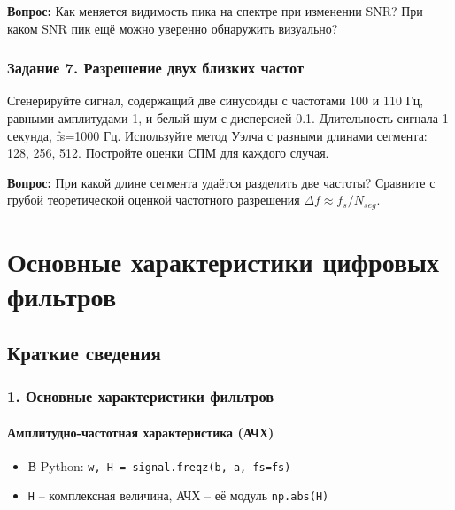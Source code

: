 \documentclass[12pt,a4paper,openany]{book}
\providecommand{\tightlist}{\setlength{\itemsep}{0pt}\setlength{\parskip}{0pt}}
\begin{document}
\textbf{Вопрос:} Как меняется видимость пика на спектре при изменении SNR? При каком SNR пик ещё можно уверенно обнаружить визуально?

\subsection*{Задание 7. Разрешение двух близких частот}

Сгенерируйте сигнал, содержащий две синусоиды с частотами 100 и 110 Гц, равными амплитудами 1, и белый шум с дисперсией 0.1. Длительность сигнала 1 секунда, fs=1000 Гц. Используйте метод Уэлча с разными длинами сегмента: 128, 256, 512. Постройте оценки СПМ для каждого случая.

\textbf{Вопрос:} При какой длине сегмента удаётся разделить две частоты? Сравните с грубой теоретической оценкой частотного разрешения \(\Delta f \approx f_s / N_{seg}\).


\chapter{Основные характеристики цифровых фильтров}

\section*{Краткие сведения}

\subsection*{1. Основные характеристики фильтров}

\subsubsection*{Амплитудно-частотная характеристика (АЧХ)}

\begin{itemize}
\tightlist
\item
  В Python: \texttt{w,\allowbreak{}\ H\ =\allowbreak{}\ signal.\allowbreak{}freqz(\allowbreak{}b,\allowbreak{}\ a,\allowbreak{}\ fs=\allowbreak{}fs)}
\item
  \texttt{H} -- комплексная величина, АЧХ -- её модуль \texttt{np.\allowbreak{}abs(\allowbreak{}H)}
\end{itemize}
\end{document}
